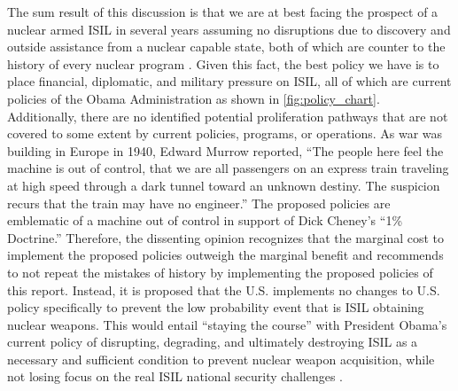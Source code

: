 \documentclass{report}
\begin{document}
The sum result of this discussion is that we are at best facing the prospect of a nuclear armed ISIL in several years assuming no disruptions due to discovery and outside assistance from a nuclear capable state, both of which are counter to the history of every nuclear program \cite{pollack2014unthinkable,Reed2010}.  Given this fact, the best policy we have is to place financial, diplomatic, and military pressure on ISIL, all of which are current policies of the Obama Administration as shown in \autoref{fig:policy_chart}.  Additionally, there are no identified potential proliferation pathways that are not covered to some extent by current policies, programs, or operations.  As war was building in Europe in 1940, Edward Murrow reported, \enquote{The people here feel the machine is out of control, that we are all passengers on an express train traveling at high speed through a dark tunnel toward an unknown destiny.  The suspicion recurs that the train may have no engineer.}  The proposed policies are emblematic of a machine out of control in support of Dick Cheney's \enquote{1\% Doctrine.} Therefore, the dissenting opinion recognizes that the marginal cost to implement the proposed policies outweigh the marginal benefit and recommends to not repeat the mistakes of history by implementing the proposed policies of this report. Instead, it is proposed that the U.S. implements no changes to U.S. policy specifically to prevent the low probability event that is ISIL obtaining nuclear weapons. This would entail \enquote{staying the course} with President Obama's current policy of disrupting, degrading, and ultimately destroying ISIL as a necessary and sufficient condition to prevent nuclear weapon acquisition, while not losing focus on the real ISIL national security challenges \cite{WhiteHouse2014}.






\end{document}
